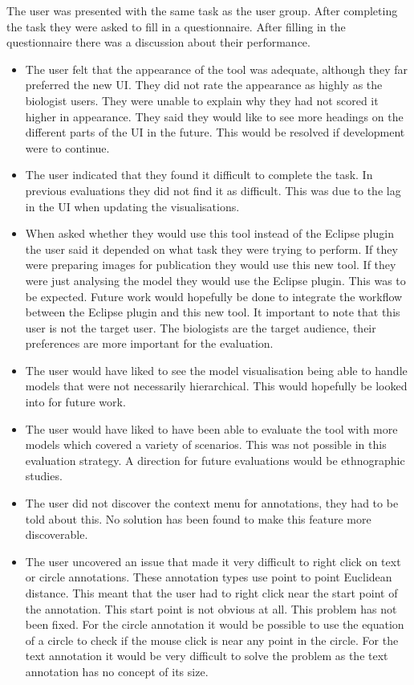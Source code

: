 The user was presented with the same task as the user group.  After completing the task they were asked to fill in a questionnaire.  After filling in the questionnaire there was a discussion about their performance.

\begin{itemize}
\item The user felt that the appearance of the tool was adequate, although they far preferred the new \ac{UI}.  They did not rate the appearance as highly as the biologist users.  They were unable to explain why they had not scored it higher in appearance.  They said they would like to see more headings on the different parts of the \ac{UI} in the future.  This would be resolved if development were to continue.
\item The user indicated that they found it difficult to complete the task.  In previous evaluations they did not find it as difficult.  This was due to the lag in the \ac{UI} when updating the visualisations.
\item When asked whether they would use this tool instead of the Eclipse plugin the user said it depended on what task they were trying to perform.  If they were preparing images for publication they would use this new tool.  If they were just analysing the model they would use the Eclipse plugin.  This was to be expected.  Future work would hopefully be done to integrate the workflow between the Eclipse plugin and this new tool.  It important to note that this user is not the target user.  The biologists are the target audience, their preferences are more important for the evaluation.
\item The user would have liked to see the model visualisation being able to handle models that were not necessarily hierarchical.  This would hopefully be looked into for future work.
\item The user would have liked to have been able to evaluate the tool with more models which covered a variety of scenarios.  This was not possible in this evaluation strategy. A direction for future evaluations would be ethnographic studies.
\item The user did not discover the context menu for annotations, they had to be told about this.  No solution has been found to make this feature more discoverable.
\item The user uncovered an issue that made it very difficult to right click on text or circle annotations.  These annotation types use point to point Euclidean distance.  This meant that the user had to right click near the start point of the annotation.  This start point is not obvious at all.  This problem has not been fixed.  For the circle annotation it would be possible to use the equation of a circle to check if the mouse click is near any point in the circle.  For the text annotation it would be very difficult to solve the problem as the text annotation has no concept of its size.
\end{itemize}

